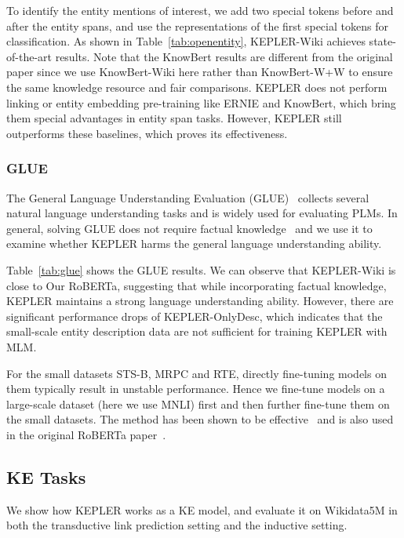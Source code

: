 To identify the entity mentions of interest, we add two special tokens before and after the entity spans, and use the representations of the first special tokens for classification. As shown in Table~\ref{tab:openentity}, KEPLER-Wiki achieves state-of-the-art results. Note that the KnowBert results are different from the original paper since we use KnowBert-Wiki here rather than KnowBert-W+W to ensure the same knowledge resource and fair comparisons. KEPLER does not perform linking or entity embedding pre-training like ERNIE and KnowBert, which bring them special advantages in entity span tasks. However, KEPLER still outperforms these baselines, which proves its effectiveness. 



\subsubsection*{GLUE}

The General Language Understanding Evaluation (GLUE)~\citep{wang-etal-2018-glue} collects several natural language understanding tasks and is widely used for evaluating PLMs. In general, solving GLUE does not require factual knowledge~\citep{zhang-etal-2019-ernie} and we use it to examine whether KEPLER harms the general language understanding ability.

Table~\ref{tab:glue} shows the GLUE results. We can observe that KEPLER-Wiki is close to Our RoBERTa, suggesting that while incorporating factual knowledge, KEPLER maintains a strong language understanding ability. However, there are significant performance drops of KEPLER-OnlyDesc, which indicates that the small-scale entity description data are not sufficient for training KEPLER with MLM.

For the small datasets STS-B, MRPC and RTE, directly fine-tuning models on them typically result in unstable performance. Hence we fine-tune models on a large-scale dataset (here we use MNLI) first and then further fine-tune them on the small datasets.
The method has been shown to be effective~\citep{wang-etal-2019-tell} and is also used in the original RoBERTa paper~\citep{liu2019roberta}.


\subsection{KE Tasks}
\label{sec:KEexp}
We show how KEPLER works as a KE model, and evaluate it on Wikidata5M in both the transductive link prediction setting and the inductive setting.

